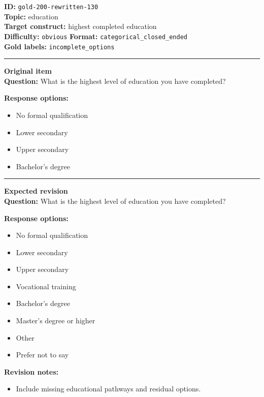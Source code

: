 \documentclass[10pt,a4paper]{article}
\newcommand{\sectionline}{\vspace{0.15em}\hrule\vspace{0.35em}}
\begin{document}
\begin{tcolorbox}[colframe=FlawRed,colback=white,colbacktitle=FlawRed!9,coltitle=black,title={Item 130\hfill Flawed item}]
\textbf{ID:} \texttt{gold-200-rewritten-130}\\
\textbf{Topic:} education\\
\textbf{Target construct:} highest completed education\\
\textbf{Difficulty:} \texttt{obvious} \quad \textbf{Format:} \texttt{categorical\_closed\_ended}\\
\textbf{Gold labels:} \texttt{incomplete\_options}\\
\sectionline
\textbf{Original item}\\
\textbf{Question:} What is the highest level of education you have completed?
\par\textbf{Response options:}
\begin{itemize}
\item No formal qualification
\item Lower secondary
\item Upper secondary
\item Bachelor's degree
\end{itemize}
\sectionline
\textbf{Expected revision}\\
\textbf{Question:} What is the highest level of education you have completed?
\par\textbf{Response options:}
\begin{itemize}
\item No formal qualification
\item Lower secondary
\item Upper secondary
\item Vocational training
\item Bachelor's degree
\item Master's degree or higher
\item Other
\item Prefer not to say
\end{itemize}
\par\textbf{Revision notes:}
\begin{itemize}
\item Include missing educational pathways and residual options.
\end{itemize}
\end{tcolorbox}
\end{document}
